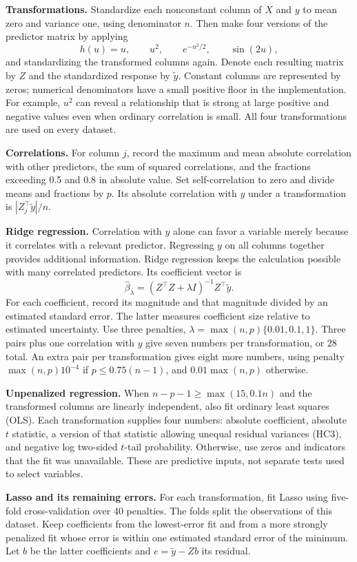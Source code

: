 \documentclass[10pt,letterpaper]{article}
\begin{document}
\textbf{Transformations.} Standardize each nonconstant column of $X$ and $y$
to mean zero and variance one, using denominator $n$. Then make
four versions of the predictor matrix by applying
\[
 h(u)=u,\qquad u^2,\qquad e^{-u^2/2},\qquad\sin(2u),
\]
and standardizing the transformed columns again. Denote each resulting
matrix by $Z$ and the standardized response by $\widetilde y$.
Constant columns are represented by zeros; numerical denominators have a
small positive floor in the implementation.
For example, $u^2$ can reveal a relationship that is strong at large
positive and negative values even when ordinary correlation is small.
All four transformations are used on every dataset.

\textbf{Correlations.} For column $j$, record the maximum and mean
absolute correlation with other predictors, the sum of squared
correlations, and the fractions exceeding 0.5 and 0.8 in absolute
value. Set self-correlation to zero and divide means and fractions
by $p$. Its absolute correlation with $y$ under a transformation is
$|Z_j^\top\widetilde y|/n$.

\textbf{Ridge regression.} Correlation with $y$ alone can favor a
variable merely because it correlates with a relevant predictor.
Regressing $y$ on all columns together provides additional information.
Ridge regression keeps the calculation possible with many correlated
predictors. Its coefficient vector is
\[
 \widehat\beta_\lambda=(Z^\top Z+\lambda I)^{-1}Z^\top\widetilde y.
\]
For each coefficient, record its magnitude and that magnitude divided
by an estimated standard error. The latter measures coefficient size
relative to estimated uncertainty. Use three penalties,
$\lambda=\max(n,p)\{0.01,0.1,1\}$. Three pairs plus one correlation
with $y$ give seven numbers per transformation, or 28 total. An extra
pair per transformation gives eight more numbers, using penalty
$\max(n,p)10^{-4}$ if $p\le0.75(n-1)$, and $0.01\max(n,p)$ otherwise.

\textbf{Unpenalized regression.} When
$n-p-1\ge\max(15,0.1n)$ and the transformed columns are linearly
independent, also fit ordinary least squares (OLS). Each transformation
supplies four numbers: absolute coefficient, absolute $t$ statistic,
a version of that statistic allowing unequal residual variances
(HC3), and negative log two-sided $t$-tail probability. Otherwise,
use zeros and indicators that the fit was unavailable. These are
predictive inputs, not separate tests used to select variables.

\textbf{Lasso and its remaining errors.} For each transformation,
fit Lasso using five-fold cross-validation over 40 penalties. The folds
split the observations of this dataset. Keep
coefficients from the lowest-error fit and from a more strongly
penalized fit whose error is within one estimated standard error
of the minimum. Let $b$ be the latter coefficients and
$e=\widetilde y-Zb$ its residual.
\end{document}

